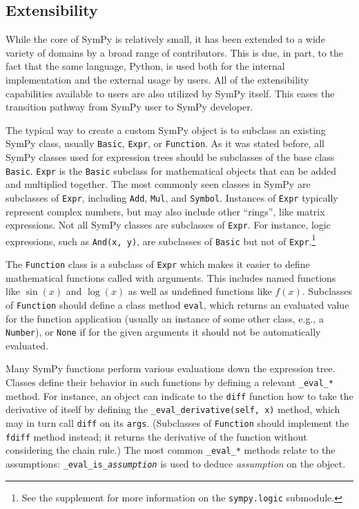 
\subsection{Extensibility}

While the core of SymPy is relatively small, it has been extended to a wide variety
of domains by a broad range of contributors.
This is due, in part, to the fact that the same language, Python,
is used both for the internal implementation and the external usage by users.
All of the extensibility capabilities available to
users are also utilized by SymPy itself. This eases the transition pathway from
SymPy user to SymPy developer.

The typical way to create a custom SymPy object is to subclass an existing
SymPy class, usually \texttt{Basic}, \texttt{Expr}, or \texttt{Function}. As
it was stated before, all SymPy classes used for expression trees should be
subclasses of the base class \texttt{Basic}. \texttt{Expr} is the
\texttt{Basic} subclass for mathematical objects that can be added and
multiplied together. The most commonly seen classes in SymPy are subclasses of
\texttt{Expr}, including \texttt{Add}, \texttt{Mul}, and \texttt{Symbol}.
Instances of \texttt{Expr} typically represent complex numbers, but may also
include other ``rings'', like matrix expressions. Not all SymPy classes are
subclasses of \texttt{Expr}. For instance, logic expressions, such as
\verb|And(x, y)|, are subclasses of \texttt{Basic} but not of
\texttt{Expr}.\footnote{See the supplement for more information on the
  \texttt{sympy.logic} submodule.}

The \texttt{Function} class is a subclass of \texttt{Expr} which makes it
easier to define mathematical functions called with arguments. This includes
named functions like $\sin(x)$ and $\log(x)$ as well as undefined functions
like $f(x)$. Subclasses of \texttt{Function} should define a
class method \texttt{eval}, which returns an evaluated value for the function
application (usually an instance of some other class, e.g., a \texttt{Number}),
or \texttt{None} if for the given arguments it should not be
automatically evaluated.

Many SymPy functions perform various evaluations down the expression tree.
Classes define their behavior in such functions by defining a relevant
\verb|_eval_|\texttt{\textit{*}} method. For instance, an object can indicate
to the \texttt{diff} function how to take the derivative of itself by defining
the \verb|_eval_derivative(self, x)| method, which may in turn call
\texttt{diff} on its \texttt{args}. (Subclasses of \texttt{Function} should
implement the \texttt{fdiff} method instead; it returns the derivative of the function
without considering the chain rule.) The most common
\verb|_eval_|\texttt{\textit{*}} methods relate to the assumptions:
\verb|_eval_is_|\texttt{\textit{assumption}} is used to deduce
\textit{assumption} on the object.

